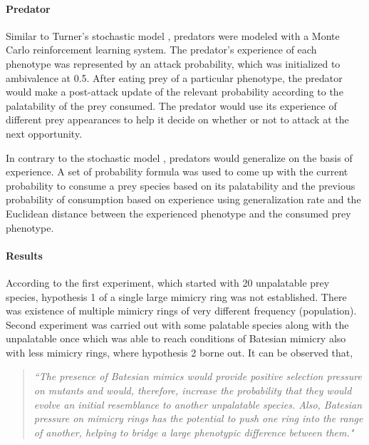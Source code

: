 \paragraph{Predator}
Similar to Turner's stochastic model \cite{turner_et_al1984},  predators were modeled with a Monte Carlo reinforcement learning system. The predator's experience of each phenotype was represented by an attack probability, which was initialized to ambivalence at 0.5. After eating prey of a particular phenotype, the predator would make a post-attack update of the relevant probability according to the palatability of the prey consumed. The predator would use its experience of different prey appearances to help it decide on whether or not to attack at the next opportunity.

In contrary to the stochastic model \cite{turner_et_al1984},  predators would generalize on the basis of experience. A set of probability formula was used to come up with the current probability to consume a prey species based on its palatability and the previous probability of consumption based on experience using generalization rate and the Euclidean distance between the experienced phenotype and the consumed prey phenotype. 

\paragraph{Results}
According to the first experiment, which started with 20 unpalatable prey species, hypothesis 1 of a single large mimicry ring was not established. There was existence of multiple mimicry rings of very different frequency (population). Second experiment was carried out with some palatable species along with the unpalatable once which was able to reach conditions of Batesian mimicry also with less mimicry rings, where hypothesis 2 borne out. It can be observed that,

\begin{quote}
\textsl{``The presence of Batesian mimics would provide positive selection pressure on mutants and would, therefore, increase the probability that they would evolve an initial resemblance to another unpalatable species. Also, Batesian pressure on mimicry rings has the potential to push one ring into the range of another, helping to bridge a large phenotypic difference between them." \cite{franks2003}}
\end{quote}

